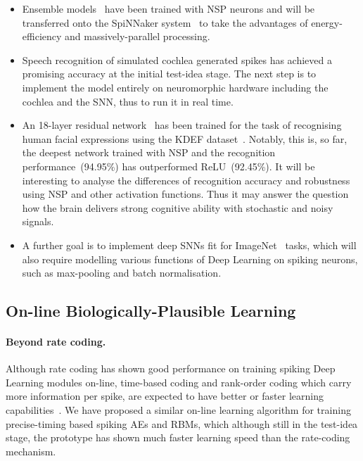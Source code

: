 \begin{itemize}
	\item Ensemble models~\citep{krogh1995neural} have been trained with NSP neurons and will be transferred onto the SpiNNaker system~\citep{furber2014spinnaker} to take the advantages of energy-efficiency and massively-parallel processing.
	\item Speech recognition of simulated cochlea generated spikes has achieved a promising accuracy at the initial test-idea stage.
	The next step is to implement the model entirely on neuromorphic hardware including the cochlea and the SNN, thus to run it in real time.
	\item An 18-layer residual network~\citep{he2016deep} has been trained for the task of recognising human facial expressions using the KDEF dataset~\citep{lundqvist1998karolinska}.
	Notably, this is, so far, the deepest network trained with NSP and the recognition performance~(94.95\%) has outperformed ReLU~(92.45\%).
	It will be interesting to analyse the differences of recognition accuracy and robustness using NSP and other activation functions.
	Thus it may answer the question how the brain delivers strong cognitive ability with stochastic and noisy signals.
 	\item A further goal is to implement deep SNNs fit for ImageNet~\citep{deng2009imagenet} tasks, which will also require modelling various functions of Deep Learning on spiking neurons, such as max-pooling and batch normalisation. 

\end{itemize}


\subsection{On-line Biologically-Plausible Learning}
\paragraph{Beyond rate coding.}
Although rate coding has shown good performance on training spiking Deep Learning modules on-line, time-based coding and rank-order coding which carry more information per spike, are expected to have better or faster learning capabilities~\citep{gautrais1998rate}.
We have proposed a similar on-line learning algorithm for training precise-timing based spiking AEs and RBMs, which although still in the test-idea stage, the prototype has shown much faster learning speed than the rate-coding mechanism.

